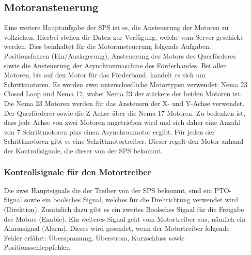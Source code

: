 \subsection{Motoransteuerung}
Eine weitere Hauptaufgabe der SPS ist es, die Ansteuerung der Motoren zu vollziehen. Hierbei stehen die Daten zur Verfügung, welche vom Server geschickt werden. Dies beinhaltet für die Motoransteuerung folgende Aufgaben: Positionsfahren (Ein/Auslagerung), Ansteuerung des Motors des Querförderes sowie die Ansteuerung der Asynchronmaschine des Förderbandes. Bei allen Motoren, bis auf den Motor für das Förderband, handelt es sich um Schrittmotoren. Es werden zwei unterschiedliche Motortypen verwendet: Nema 23 Closed Loop und Nema 17, wobei Nema 23 der stärkere der beiden Motoren ist. Die Nema 23 Motoren werden für das Ansteuern der X- und Y-Achse verwendet. Der Querförderer sowie die Z-Achse über die Nema 17 Motoren. Zu bedenken ist, dass jede Achse von zwei Motoren angetrieben wird und sich daher eine Anzahl von 7 Schrittmotoren plus einen Asynchronmotor ergibt. Für jeden der Schrittmotoren gibt es eine Schrittmotortreiber. Dieser regelt den Motor anhand der Kontrollsignale, die dieser von der SPS bekommt. 

\subsubsection[Kontrollsignale für den Motortreiber]
{Kontrollsignale für den Motortreiber }

Die zwei Hauptsignale die der Treiber von der SPS bekommt, sind ein PTO-Signal sowie ein boolsches Signal, welches für die Drehrichtung verwendet wird (Direktion). Zusätzlich dazu gibt es ein zweites Boolsches Signal für die Freigabe des Motors (Enable). Ein weiteres Signal geht vom Motortreiber aus, nämlich ein Alarmsignal (Alarm). Dieses wird gesendet, wenn der Motortreiber folgende Fehler erfährt: Überspannung, Überstrom, Kurzschluss sowie Positionsschleppfehler.

